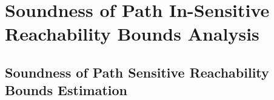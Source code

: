 \section{Soundness of Path In-Sensitive Reachability Bounds Analysis}
\label{apdx:reachability_soundness}

\clearpage

\subsection{Soundness of Path Sensitive Reachability Bounds Estimation}
\label{apdx:ps_reachability_soundness}

\clearpage